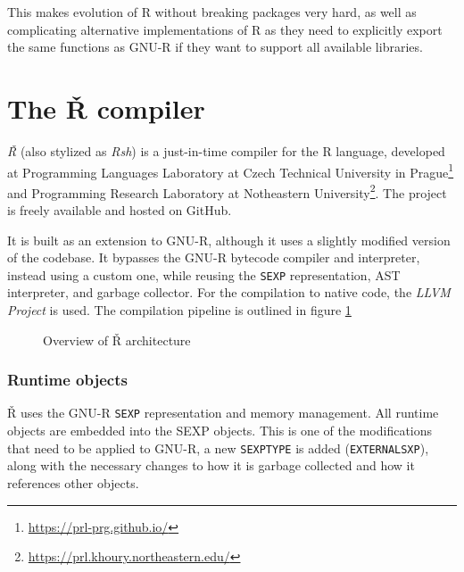This makes evolution of R without breaking packages very hard, as well as complicating alternative implementations of R as they need to explicitly export the same functions as GNU-R if they want to support all available libraries.

\newpage
\section{The Ř compiler}

\textit{Ř} (also stylized as \textit{Rsh}) is a just-in-time compiler for the R language, developed at Programming Languages Laboratory at Czech Technical University in Prague\footnote{\url{https://prl-prg.github.io/}} and Programming Research Laboratory at Notheastern University\footnote{\url{https://prl.khoury.northeastern.edu/}}. The project is freely available and hosted on GitHub\todocite.

It is built as an extension to GNU-R, although it uses a slightly modified version of the codebase. It bypasses the GNU-R bytecode compiler and interpreter, instead using a custom one, while reusing the \texttt{SEXP} representation, AST interpreter, and garbage collector. For the compilation to native code, the \textit{LLVM Project}\cite{llvm} is used. The compilation pipeline is outlined in figure \ref{fig:rsh-archit}

\begin{figure}
	\centering
	\caption{Overview of Ř architecture\cite{reusing-jit}}\label{fig:rsh-archit}
\end{figure}

\subsubsection*{Runtime objects}

Ř uses the GNU-R \texttt{SEXP} representation and memory management. All runtime objects are embedded into the SEXP objects. This is one of the modifications that need to be applied to GNU-R, a new \texttt{SEXPTYPE} is added (\texttt{EXTERNALSXP}), along with the necessary changes to how it is garbage collected and how it references other objects.

